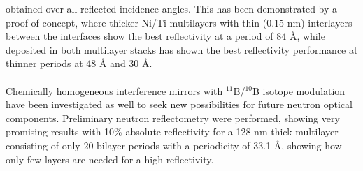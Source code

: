 obtained over all reflected incidence angles. This has been demonstrated by a proof of concept, where thicker Ni/Ti multilayers with thin (0.15 nm) \BC interlayers between the interfaces show the best reflectivity at a period of 84 Å, while \BC deposited in both multilayer stacks has shown the best reflectivity performance at thinner periods at 48 Å and 30 Å. \\
\\ Chemically  homogeneous  \natBC interference mirrors with  $^\textrm{11}$B/$^\textrm{10}$B  isotope modulation have been investigated as well to seek new possibilities for future neutron optical components. Preliminary neutron reflectometry were performed, showing very promising results with 10\% absolute reflectivity for a 128 nm thick multilayer consisting of only 20 bilayer periods with a periodicity of 33.1 Å, showing how only few layers are needed for a high reflectivity. 